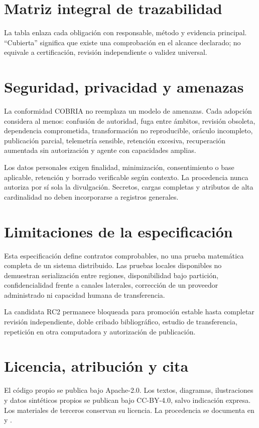 \documentclass[11pt,letterpaper]{article}
\begin{document}
\section{Matriz integral de trazabilidad}
La tabla enlaza cada obligación con responsable, método y evidencia principal. ``Cubierta''
significa que existe una comprobación en el alcance declarado; no equivale a certificación,
revisión independiente o validez universal.


\section{Seguridad, privacidad y amenazas}
La conformidad COBRIA no reemplaza un modelo de amenazas. Cada adopción considera al
menos: confusión de autoridad, fuga entre ámbitos, revisión obsoleta, dependencia
comprometida, transformación no reproducible, oráculo incompleto, publicación parcial,
telemetría sensible, retención excesiva, recuperación aumentada sin autorización y agente
con capacidades amplias.

Los datos personales exigen finalidad, minimización, consentimiento o base aplicable,
retención y borrado verificable según contexto. La procedencia nunca autoriza por sí sola
la divulgación. Secretos, cargas completas y atributos de alta cardinalidad no deben
incorporarse a registros generales.

\section{Limitaciones de la especificación}
Esta especificación define contratos comprobables, no una prueba matemática completa de
un sistema distribuido. Las pruebas locales disponibles no demuestran serialización entre
regiones, disponibilidad bajo partición, confidencialidad frente a canales laterales,
corrección de un proveedor administrado ni capacidad humana de transferencia.

La candidata RC2 permanece bloqueada para promoción estable hasta completar revisión
independiente, doble cribado bibliográfico, estudio de transferencia, repetición en otra
computadora y autorización de publicación.

\section{Licencia, atribución y cita}
El código propio se publica bajo Apache-2.0. Los textos, diagramas, ilustraciones y datos
sintéticos propios se publican bajo CC-BY-4.0, salvo indicación expresa. Los materiales de
terceros conservan su licencia. La procedencia se documenta en  y
.
\end{document}
